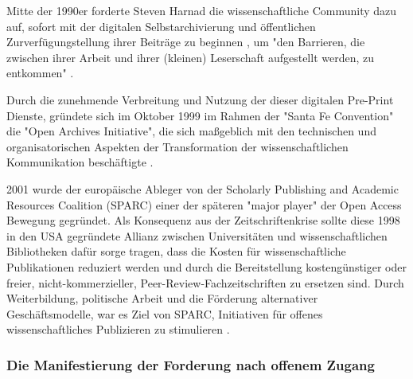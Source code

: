 Mitte der 1990er forderte Steven Harnad die wissenschaftliche Community dazu auf, sofort mit der digitalen Selbstarchivierung und öffentlichen Zurverfügungstellung ihrer Beiträge zu beginnen \cite{albert_2006_open_implications}, um "den Barrieren, die zwischen ihrer Arbeit und ihrer (kleinen) Leserschaft aufgestellt werden, zu entkommen" \cite{harnad_1995_subversive_proposal}.

Durch die zunehmende Verbreitung und Nutzung der dieser digitalen Pre-Print Dienste, gründete sich im Oktober 1999 im Rahmen der "Santa Fe Convention" die "Open Archives Initiative", die sich maßgeblich mit den technischen und organisatorischen Aspekten der Transformation der wissenschaftlichen Kommunikation beschäftigte \cite{van_2000_santa_fe}.

2001 wurde der europäische Ableger von der Scholarly Publishing and Academic Resources Coalition (SPARC) einer der späteren "major player" der Open Access Bewegung \cite{russell2008business} \cite{Herb_2012} gegründet. Als Konsequenz aus der Zeitschriftenkrise sollte diese 1998 in den USA gegründete Allianz zwischen Universitäten und wissenschaftlichen Bibliotheken dafür sorge tragen, dass die Kosten für wissenschaftliche Publikationen reduziert werden und durch die Bereitstellung kostengünstiger oder freier, nicht-kommerzieller, Peer-Review-Fachzeitschriften zu ersetzen sind. Durch Weiterbildung, politische Arbeit und die Förderung alternativer Geschäftsmodelle, war es Ziel von SPARC, Initiativen für offenes wissenschaftliches Publizieren zu stimulieren \cite{suchen}.

\subsubsection{Die Manifestierung der Forderung nach offenem Zugang}

